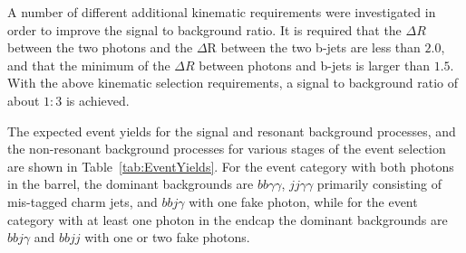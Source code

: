 A number of different additional kinematic requirements were investigated in order to improve the signal to background ratio. It is required that the $\Delta R$ between the two photons and the $\Delta$R between the two b-jets are less than $2.0$, and that the minimum of the 
$\Delta R$ between photons and b-jets is larger than $1.5$. With the above kinematic selection requirements, a signal to background ratio of about $1:3$ is achieved.

The expected event yields for the signal and resonant background processes, and the 
non-resonant background processes for various stages of the event selection
are shown in Table~\ref{tab:EventYields}. For the event category with both photons
in the barrel, the dominant backgrounds are $bb\gamma\gamma$, $jj\gamma\gamma$ primarily
consisting of mis-tagged charm jets, and $bbj\gamma$ with one fake photon, while for the
event category with at least one photon in the endcap the dominant backgrounds are
$bbj\gamma$ and $bbjj$ with one or two fake photons.


